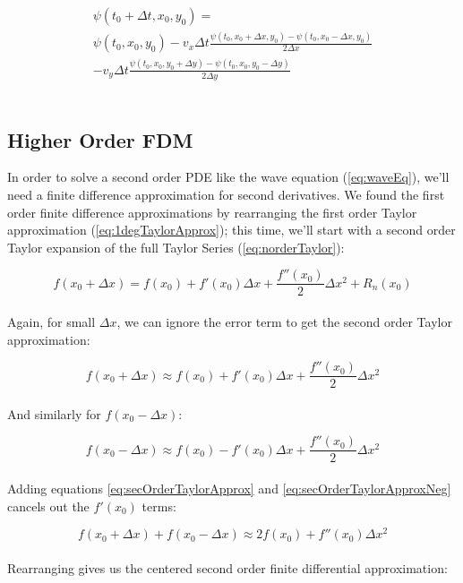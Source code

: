 {\begin{multline}\label{eq:advection2Dapprox}
   \psi(t_{0} + \Delta  t,  x_{0}, y_{0}) =\\
   \psi(t_{0}, x_{0}, y_{0}) -v_{x}\Delta t\frac{\psi(t_{0}, x_{0} + \Delta  x, y_{0})-\psi(t_{0}, x_{0}-\Delta x, y_{0})}{2\Delta  x}\\
   -v_{y}\Delta t\frac{\psi(t_{0}, x_{0}, y_{0} + \Delta  y)-\psi(t_{0}, x_{0}, y_{0}-\Delta y)}{2\Delta  y} 
\end{multline}
\\
\subsection{Higher Order FDM}

In order to solve a second order PDE like the wave equation (\ref{eq:waveEq}), we'll need a finite difference approximation for second derivatives.  We found the first order finite difference approximations by rearranging the first order Taylor approximation (\ref{eq:1degTaylorApprox}); this time, we'll start with a second order Taylor expansion of the full Taylor Series (\ref{eq:norderTaylor}):

 \begin{equation}
  f(x_{0} + \Delta  x) = f(x_{0}) + f'(x_{0})\Delta  x + \frac{f''(x_{0})}{2}\Delta  x^{2} + R_{n}(x_{0})
  \end{equation}
    \\
  Again, for small $\Delta  x$, we can ignore the error term to get the second order Taylor approximation:
  
   \begin{equation}\label{eq:secOrderTaylorApprox}
  f(x_{0} + \Delta  x) \approx f(x_{0}) + f'(x_{0})\Delta  x + \frac{f''(x_{0})}{2}\Delta  x^{2}
  \end{equation}
    \\
  And similarly for  $f(x_{0} - \Delta  x)$:
  
     \begin{equation}\label{eq:secOrderTaylorApproxNeg}
  f(x_{0} - \Delta  x) \approx f(x_{0}) - f'(x_{0})\Delta  x + \frac{f''(x_{0})}{2}\Delta  x^{2}
  \end{equation}
    \\
  Adding equations \ref{eq:secOrderTaylorApprox} and \ref{eq:secOrderTaylorApproxNeg} cancels out the $f'(x_{0})$ terms:
  
   \begin{equation}
  f(x_{0} + \Delta  x) + f(x_{0} - \Delta  x) \approx 2f(x_{0}) + f''(x_{0})\Delta  x^{2}
  \end{equation}
    \\
  Rearranging gives us the centered second order finite differential approximation:
  
}
